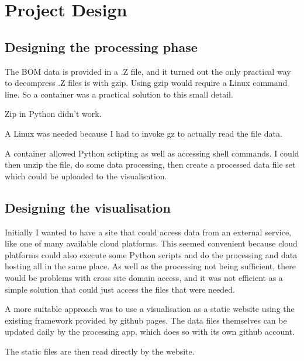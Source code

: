 \documentclass[12pt,a4paper]{report}
\begin{document}



\section{Project Design}


\subsection{Designing the processing phase}
The BOM data is provided in a .Z file, and it turned out the only practical way to decompress .Z files is with gzip. Using gzip would require a Linux command line. So a container was a practical solution to this small detail.

Zip in Python didn't work. 

A Linux was needed because I had to invoke gz to actually read the file data. 

A container allowed Python sctipting as well as accessing shell commands. I could then unzip the file, do some data processing, then create a processed data file set which could be uploaded to the visualisation.


\subsection{Designing the visualisation}

Initially I wanted to have a site that could access data from an external service, like one of many available cloud platforms. This seemed convenient because cloud platforms could also execute some Python scripts and do the processing and data hosting all in the same place. As well as the processing not being sufficient, there would be problems with cross site domain access, and it was not efficient as a simple solution that could just access the files that were needed.

A more suitable approach was to use a visualisation as a static website using the existing framework provided by github pages. The data files themselves can be updated daily by the processing app, which does so with its own github account.

The static files are then read directly by the website.
\end{document}
